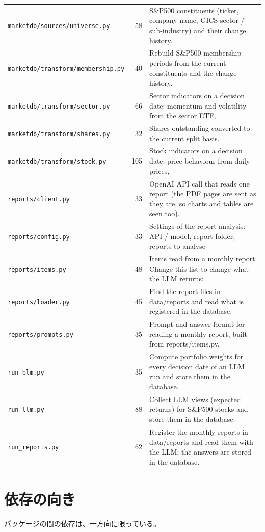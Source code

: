 \documentclass[xelatex,ja=standard,jafont=hiragino-pron,a4paper,10pt]{bxjsreport}
\begin{document}
{\begin{longtable}{p{5.20cm}rp{8.20cm}}
\texttt{marketdb/sources/universe.py} & 58 & S\&P500 constituents (ticker, company name, GICS sector / sub-industry) and their change history. \\
\texttt{marketdb/\allowbreak{}transform/\allowbreak{}membership.\allowbreak{}py} & 40 & Rebuild S\&P500 membership periods from the current constituents and the change history. \\
\texttt{marketdb/transform/sector.py} & 66 & Sector indicators on a decision date: momentum and volatility from the sector ETF, \\
\texttt{marketdb/transform/shares.py} & 32 & Shares outstanding converted to the current split basis. \\
\texttt{marketdb/transform/stock.py} & 105 & Stock indicators on a decision date: price behaviour from daily prices, \\
\texttt{reports/client.py} & 33 & OpenAI API call that reads one report (the PDF pages are sent as they are, so charts and tables are seen too). \\
\texttt{reports/config.py} & 33 & Settings of the report analysis: API / model, report folder, reports to analyse \\
\texttt{reports/items.py} & 48 & Items read from a monthly report. Change this list to change what the LLM returns: \\
\texttt{reports/loader.py} & 45 & Find the report files in data/reports and read what is registered in the database. \\
\texttt{reports/prompts.py} & 35 & Prompt and answer format for reading a monthly report, built from reports/items.py. \\
\texttt{run\_\allowbreak{}blm.py} & 35 & Compute portfolio weights for every decision date of an LLM run and store them in the database. \\
\texttt{run\_\allowbreak{}llm.py} & 88 & Collect LLM views (expected returns) for S\&P500 stocks and store them in the database. \\
\texttt{run\_\allowbreak{}reports.py} & 62 & Register the monthly reports in data/reports and read them with the LLM; the answers are stored in the database. \\
\end{longtable}
}

\section{依存の向き}

パッケージの間の依存は、一方向に限っている。
\end{document}
